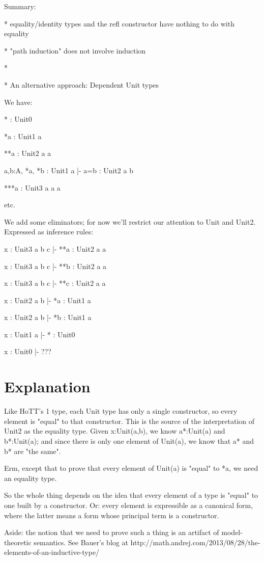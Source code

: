 \documentclass{article}
\begin{document}
Summary:

    * equality/identity types and the refl constructor have nothing to do with equality

    * "path induction" does not involve induction

    * 

* An alternative approach: Dependent Unit types

We have:

*    : Unit0

*a   : Unit1 a

**a  : Unit2 a a

a,b:A, *a, *b : Unit1 a |- a=b : Unit2 a b

***a : Unit3 a a a

etc.



We add some eliminators; for now we'll restrict our attention to
Unit and Unit2.  Expressed as inference rules:

x : Unit3 a b c |-  **a : Unit2 a a

x : Unit3 a b c |-  **b : Unit2 a a

x : Unit3 a b c |-  **c : Unit2 a a

x : Unit2 a b |-  *a : Unit1 a

x : Unit2 a b |-  *b : Unit1 a

x : Unit1 a   |-  *  : Unit0

x : Unit0     |-  ???

\section{Explanation}

Like HoTT's 1 type, each Unit type has only a single constructor, so
every element is "equal" to that constructor.  This is the source of
the interpretation of Unit2 as the equality type.  Given x:Unit(a,b),
we know a*:Unit(a) and b*:Unit(a); and since there is only one element
of Unit(a), we know that a* and b* are "the same".

Erm, except that to prove that every element of Unit(a) is "equal" to
*a, we need an equality type.

So the whole thing depends on the idea that every element of a type is
"equal" to one built by a constructor.  Or: every element is
expressible as a canonical form, where the latter means a form whose
principal term is a constructor.

Aside: the notion that we need to prove such a thing is an artifact of
model-theoretic semantics.  See Bauer's blog at
http://math.andrej.com/2013/08/28/the-elements-of-an-inductive-type/
\end{document}
